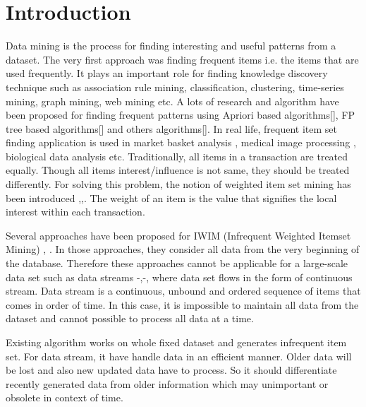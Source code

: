 \chapter{Introduction}
Data mining is the process for finding interesting and useful patterns from a dataset. The very first approach was finding frequent items i.e. the items that are used frequently. It plays an important role for finding knowledge discovery technique such as association rule mining, classification, clustering, time-series mining, graph mining, web mining etc. A lots of research and algorithm have been proposed for finding frequent patterns using Apriori based algorithms[], FP tree based algorithms[] and others algorithms[]. In real life, frequent item set finding application is used in market basket analysis \cite{agrawal1993mining}, medical image processing \cite{antonie2001application}, biological data analysis \cite{cong2004farmer} etc. Traditionally, all items in a transaction are treated equally. Though all items interest/influence is not same, they should be treated differently. For solving this problem, the notion of weighted item set mining has been introduced \cite{sun2008mining},\cite{tao2003weighted},\cite{wang2000efficient}. The weight of an item is the value that signifies the local interest within each transaction. 
\par
Several approaches have been proposed for IWIM (Infrequent Weighted Itemset Mining) \cite{manning2005new}, \cite{manning2008recursive}. In those approaches, they consider all data from the very beginning of the database. Therefore these approaches cannot be applicable for a large-scale data set such as data streams \cite{chang2005estwin}-\cite{chi2004moment},\cite{raissi2007towards}-\cite{leung2006dstree}, where data set flows in the form of continuous stream. Data stream is a continuous, unbound and ordered sequence of items that comes in order of time. In this case, it is impossible to maintain all data from the dataset and cannot possible to process all data at a time.  
\par
Existing algorithm works on whole fixed dataset and generates infrequent item set. For data stream, it have handle data in an efficient manner. Older data will be lost and also new updated data have to process. So it should differentiate recently generated data from older information which may unimportant or obsolete in context of time.
